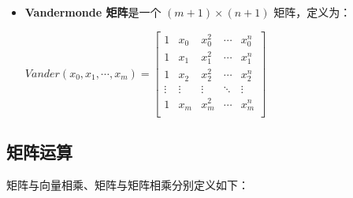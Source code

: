 \begin{tcolorbox}[title={\textbf{\tboxdef{\ref*{subsec:vandermonde}} 矩阵}}]
\begin{itemize}
$ $


\item \textbf{Vandermonde 矩阵}是一个 $(m + 1) \times (n + 1)$ 矩阵，定义为：

$\mathit{Vander}(x_0, x_1, \cdots, x_{m}) = \begin{bmatrix}
1 & x_0 & x_0^2 & \cdots & x_0^n\\
1 & x_1 & x_1^2 & \cdots & x_1^n \\
1 & x_2 & x_2^2 & \cdots & x_2^n \\
\vdots & \vdots & \vdots & \ddots & \vdots \\
1 & x_m & x_m^2 & \cdots & x_m^{n} \\
\end{bmatrix}$


\end{itemize}

\end{tcolorbox}


 





\subsection{矩阵运算}
\label{subsec:matrix-arithmetic}


矩阵与向量相乘、矩阵与矩阵相乘分别定义如下：




